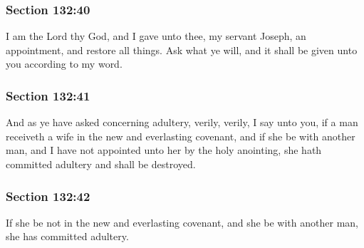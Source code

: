 	\subsubsection{Section 132:40} %
		\label{DC132-40}

		I am the Lord thy God, and I gave unto thee, my servant Joseph, an appointment, and restore all things. Ask what ye will, and it shall be given unto you according to my word.


	\subsubsection{Section 132:41} %
		\label{DC132-41}

		And as ye have asked concerning adultery, verily, verily, I say unto you, if a man receiveth a wife in the new and everlasting covenant, and if she be with another man, and I have not appointed unto her by the holy anointing, she hath committed adultery and shall be destroyed.


	\subsubsection{Section 132:42} %
		\label{DC132-42}

		If she be not in the new and everlasting covenant, and she be with another man, she has committed adultery.


